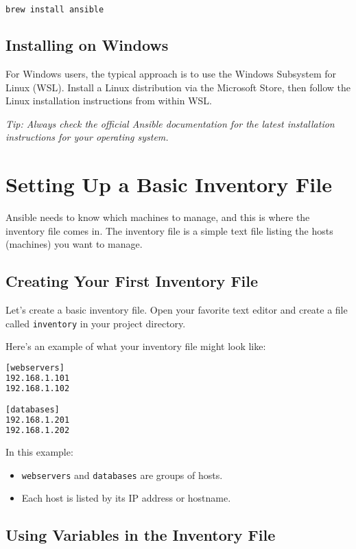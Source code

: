 \begin{lstlisting}[language=bash, caption=Install Ansible on macOS]
brew install ansible
\end{lstlisting}

\subsection{Installing on Windows}

For Windows users, the typical approach is to use the Windows Subsystem for Linux (WSL). Install a Linux distribution via the Microsoft Store, then follow the Linux installation instructions from within WSL.

\textit{Tip: Always check the official Ansible documentation for the latest installation instructions for your operating system.}

\section{Setting Up a Basic Inventory File}

Ansible needs to know which machines to manage, and this is where the inventory file comes in. The inventory file is a simple text file listing the hosts (machines) you want to manage.

\subsection{Creating Your First Inventory File}

Let's create a basic inventory file. Open your favorite text editor and create a file called \texttt{inventory} in your project directory.

Here's an example of what your inventory file might look like:
\begin{lstlisting}[language=bash, caption=Basic Inventory File]
[webservers]
192.168.1.101
192.168.1.102

[databases]
192.168.1.201
192.168.1.202
\end{lstlisting}

In this example:
\begin{itemize}
    \item \texttt{webservers} and \texttt{databases} are groups of hosts.
    \item Each host is listed by its IP address or hostname.
\end{itemize}

\subsection{Using Variables in the Inventory File}


